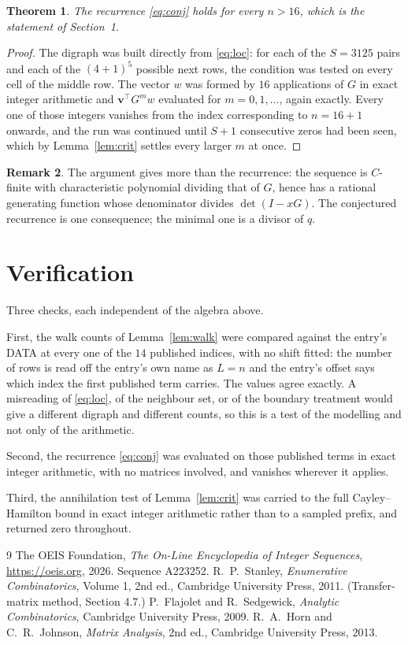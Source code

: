 \documentclass[11pt,a4paper]{article}
\theoremstyle{plain}
\newtheorem{theorem}{Theorem}
\theoremstyle{definition}
\newtheorem{remark}[theorem]{Remark}
\begin{document}
\begin{theorem}
The recurrence \eqref{eq:conj} holds for every $n>16$, which is the statement of
Section~1.
\end{theorem}

\begin{proof}
The digraph was built directly from \eqref{eq:loc}: for each of the $S=3125$ pairs and each
of the $(4+1)^{5}$ possible next rows, the condition was tested on every cell of
the middle row. The vector $w$ was formed by $16$ applications of $G$ in exact integer
arithmetic and $\mathbf{v}^{\!\top}G^{m}w$ evaluated for $m=0,1,\dots$, again exactly.
Every one of those integers vanishes from the index corresponding to $n=16+1$ onwards,
and the run was continued until $S+1$ consecutive zeros had been seen, which by
Lemma~\ref{lem:crit} settles every larger $m$ at once.
\end{proof}

\begin{remark}
The argument gives more than the recurrence: the sequence is $C$-finite with characteristic
polynomial dividing that of $G$, hence has a rational generating function whose denominator
divides $\det(I-xG)$. The conjectured recurrence is one consequence; the minimal one is a
divisor of $q$.
\end{remark}

\section{Verification}

Three checks, each independent of the algebra above.

First, the walk counts of Lemma~\ref{lem:walk} were compared against the entry's DATA at
every one of the $14$ published indices, with no shift fitted: the number of rows is
read off the entry's own name as $L=n$ and the entry's offset says which index the first
published term carries. The values agree exactly. A misreading of \eqref{eq:loc}, of the
neighbour set, or of the boundary treatment would give a different digraph and different
counts, so this is a test of the modelling and not only of the arithmetic.

Second, the recurrence \eqref{eq:conj} was evaluated on those published terms in exact
integer arithmetic, with no matrices involved, and vanishes wherever it applies.

Third, the annihilation test of Lemma~\ref{lem:crit} was carried to the full
Cayley--Hamilton bound in exact integer arithmetic rather than to a sampled prefix, and
returned zero throughout.

\begin{thebibliography}{9}
 The OEIS Foundation, \emph{The On-Line Encyclopedia of Integer
Sequences}, \url{https://oeis.org}, 2026. Sequence A223252.
 R.~P.~Stanley, \emph{Enumerative Combinatorics}, Volume 1, 2nd ed.,
Cambridge University Press, 2011. (Transfer-matrix method, Section 4.7.)
 P.~Flajolet and R.~Sedgewick, \emph{Analytic Combinatorics}, Cambridge
University Press, 2009.
 R.~A.~Horn and C.~R.~Johnson, \emph{Matrix Analysis}, 2nd ed., Cambridge
University Press, 2013.
\end{thebibliography}
\end{document}
